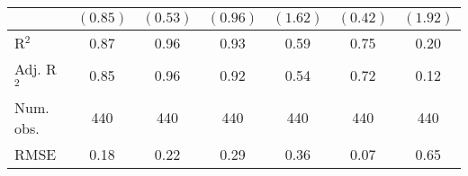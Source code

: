 \documentclass[fullpage]{paper}
\begin{document}
\begin{center}
\begin{longtable}{l c c c c c c }
            & $(0.85)$      & $(0.53)$       & $(0.96)$       & $(1.62)$       & $(0.42)$      & $(1.92)$      \\
\hline
R$^2$       & 0.87          & 0.96           & 0.93           & 0.59           & 0.75          & 0.20          \\
Adj. R$^2$  & 0.85          & 0.96           & 0.92           & 0.54           & 0.72          & 0.12          \\
Num. obs.   & 440           & 440            & 440            & 440            & 440           & 440           \\
RMSE        & 0.18          & 0.22           & 0.29           & 0.36           & 0.07          & 0.65          \\
\end{longtable}
\end{center}
\end{document}
